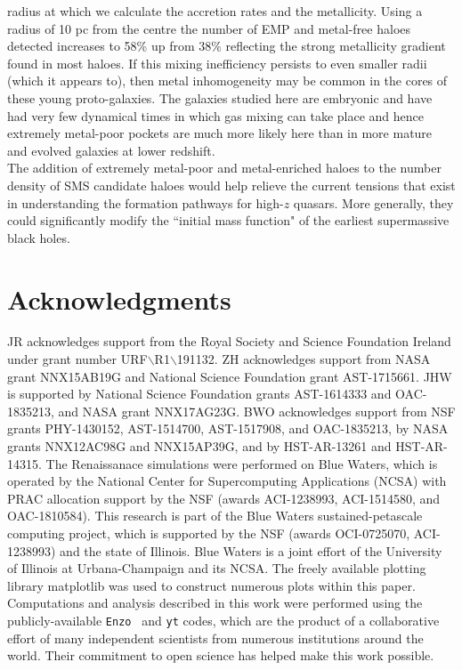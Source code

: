 \documentclass[twocolumn,iop,revtex4]{openjournal}
\newcommand{\enzo}{\texttt{Enzo~}}
\newcommand{\yt}{\texttt{yt}}
\begin{document}
radius at which we calculate the accretion rates and the metallicity. Using a radius of 10 pc
from the centre the number of EMP and metal-free haloes detected increases to 58\% up from 38\%
reflecting the strong metallicity gradient found in most haloes. 
If this mixing inefficiency persists to even smaller radii (which it appears to),
then metal inhomogeneity may be common in the cores of these young proto-galaxies. The galaxies
studied here are embryonic and have had very few dynamical times in which 
gas mixing can take place and hence extremely metal-poor pockets are much more likely here than
in more mature and evolved galaxies at lower redshift.\\
\indent  The addition of extremely metal-poor and metal-enriched haloes to the number density of SMS
candidate haloes would help relieve the current tensions that exist in understanding the formation
pathways for high-$z$ quasars. More generally, they could significantly modify the
``initial mass function" of the earliest supermassive black holes.

\section*{Acknowledgments}

\noindent JR acknowledges support from the Royal Society and Science Foundation Ireland under
grant number URF$\backslash$R1$\backslash$191132.
ZH acknowledges support from NASA grant NNX15AB19G and National Science Foundation grant AST-1715661.
JHW is supported by National Science Foundation grants AST-1614333 and
OAC-1835213, and NASA grant NNX17AG23G.  
BWO acknowledges support from NSF  grants  PHY-1430152,  AST-1514700, AST-1517908, and  OAC-1835213,  by  NASA grants NNX12AC98G and NNX15AP39G, and by HST-AR-13261 and HST-AR-14315.  
The Renaissanace simulations were performed on Blue 
Waters, which is operated by the National Center for Supercomputing Applications (NCSA)
with PRAC allocation support by the NSF (awards ACI-1238993, ACI-1514580, and OAC-1810584).
This research is part of the Blue Waters sustained-petascale computing project, which
is supported by the NSF (awards OCI-0725070, ACI-1238993) and the state of
Illinois. Blue Waters is a joint effort of the University of Illinois at
Urbana-Champaign and its NCSA.  The freely available plotting library {\sc
matplotlib} \citep{matplotlib} was used to construct numerous plots within this
paper. Computations and analysis described in this work were performed using the
publicly-available \enzo \citep{Enzo_2014, Enzo_2019} and \yt{} \citep{YT} codes, which are the product of a
collaborative effort of many independent scientists from numerous institutions
around the world. Their commitment to open science
has helped make this work possible.



\end{document}
